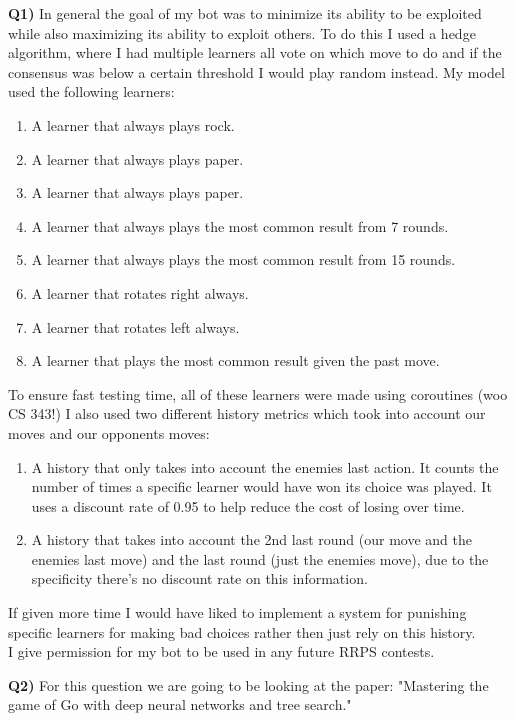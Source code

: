 \documentclass{article}
\begin{document}
\begin{titlepage}
\vspace{0.5cm}
\textbf{Q1)} In general the goal of my bot was to minimize its ability to be exploited while also maximizing its ability to exploit others. To do this I used a hedge algorithm, where I had multiple learners all vote on which move to do and if the consensus was below a certain threshold I would play random instead. My model used the following learners:
\begin{enumerate}
  \item A learner that always plays rock.
  \item A learner that always plays paper.
  \item A learner that always plays paper.
  \item A learner that always plays the most common result from 7 rounds.
  \item A learner that always plays the most common result from 15 rounds.
  \item A learner that rotates right always.
  \item A learner that rotates left always.
  \item A learner that plays the most common result given the past move.
\end{enumerate}
To ensure fast testing time, all of these learners were made using coroutines (woo CS 343!) I also used two different history metrics which took into account our moves and our opponents moves:
\begin{enumerate}
  \item A history that only takes into account the enemies last action. It counts the number of times a specific learner would have won its choice was played. It uses a discount rate of 0.95 to help reduce the cost of losing over time.
  \item A history that takes into account the 2nd last round (our move and the enemies last move) and the last round (just the enemies move), due to the specificity there's no discount rate on this information.
\end{enumerate}
If given more time I would have liked to implement a system for punishing specific learners for making bad choices rather then just rely on this history.\\

I give permission for my bot to be used in any future RRPS contests.

\newpage
\textbf{Q2)} For this question we are going to be looking at the paper: "Mastering the game of Go with deep neural networks and tree search." \\\\


\end{titlepage}
\end{document}
